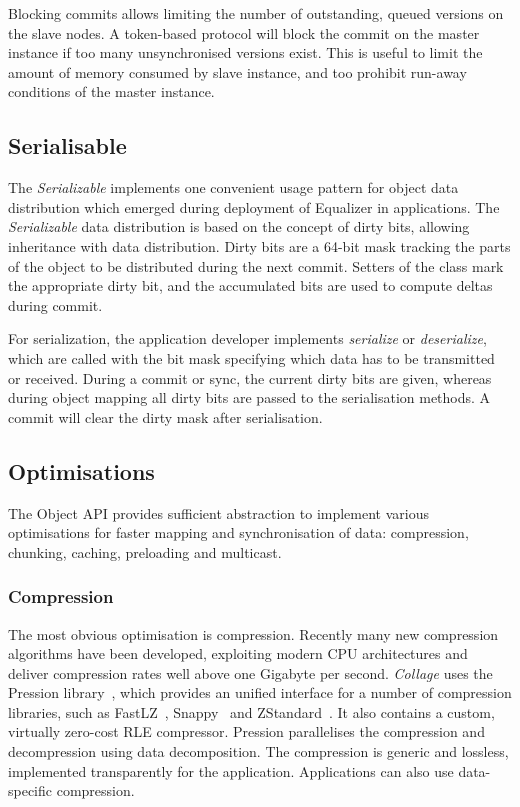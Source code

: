 Blocking commits allows limiting the number of outstanding, queued versions on
the slave nodes. A token-based protocol will block the commit on the master
instance if too many unsynchronised versions exist. This is useful to limit the
amount of memory consumed by slave instance, and too prohibit run-away
conditions of the master instance.

\subsection{Serialisable}

\label{sec:Serializable}The {\em Serializable} implements one convenient usage
pattern for object data distribution which emerged during deployment of
Equalizer in applications. The {\em Serializable} data distribution is based on
the concept of dirty bits, allowing inheritance with data distribution. Dirty
bits are a 64-bit mask tracking the parts of the object to be distributed
during the next commit. Setters of the class mark the appropriate dirty bit,
and the accumulated bits are used to compute deltas during commit.

For serialization, the application developer implements {\em serialize} or
{\em deserialize}, which are called with the bit mask specifying which data
has to be transmitted or received. During a commit or sync, the current dirty
bits are given, whereas during object mapping all dirty bits are passed to the
serialisation methods. A commit will clear the dirty mask after serialisation.


\subsection{Optimisations}

The Object API provides sufficient abstraction to implement various
optimisations for faster mapping and synchronisation of data: compression,
chunking, caching, preloading and multicast.

\subsubsection{Compression}

The most obvious optimisation is compression. Recently many new compression
algorithms have been developed, exploiting modern CPU architectures and
deliver compression rates well above one Gigabyte per second. {\em Collage}
uses the Pression library~\cite{pression}, which provides an unified interface
for a number of compression libraries, such as FastLZ~\cite{jesperfast},
Snappy~\cite{snappy} and ZStandard~\cite{zstd}. It also contains a custom,
virtually zero-cost RLE compressor. Pression parallelises the compression and
decompression using data decomposition. The compression is generic and
lossless, implemented transparently for the application. Applications can also
use data-specific compression.

